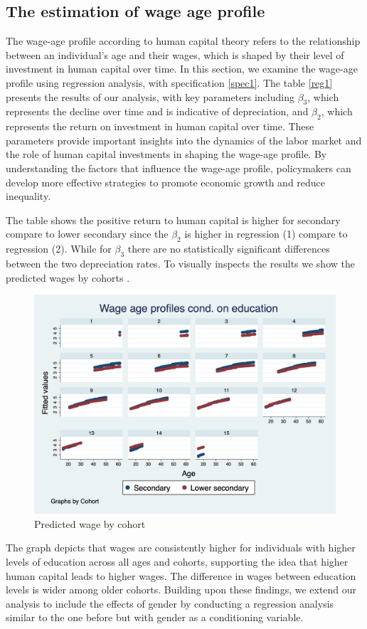\documentclass[14pt]{sistedes}
\begin{document}
\subsection{The estimation of wage age profile}
The wage-age profile according to human capital theory refers to the relationship between an individual's age and their wages, which is shaped by their level of investment in human capital over time. In this section, we examine the wage-age profile using regression analysis, with specification \ref{spec1}. The table \ref{reg1} presents the results of our analysis, with key parameters including \(\beta_3\), which represents the decline over time and is indicative of depreciation, and \(\beta_2\), which represents the return on investment in human capital over time. These parameters provide important insights into the dynamics of the labor market and the role of human capital investments in shaping the wage-age profile. By understanding the factors that influence the wage-age profile, policymakers can develop more effective strategies to promote economic growth and reduce inequality.

The table shows the positive return to human capital is higher for secondary compare to lower secondary since the $\beta_2$ is higher in regression (1) compare to regression (2). While for $\beta_3$ there are no statistically significant  differences between the two depreciation rates. To visually inspects the results we show the predicted wages by cohorts .
\begin{figure}
    \centering
    \includegraphics[scale=0.3]{graph1.png}
    \caption{Predicted wage by cohort}
    \label{fig:pred_reg}
\end{figure}
The graph depicts that wages are consistently higher for individuals with higher levels of education across all ages and cohorts, supporting the idea that higher human capital leads to higher wages. The difference in wages between education levels is wider among older cohorts. Building upon these findings, we extend our analysis to include the effects of gender by conducting a regression analysis similar to the one before but with gender as a conditioning variable.
\end{document}
